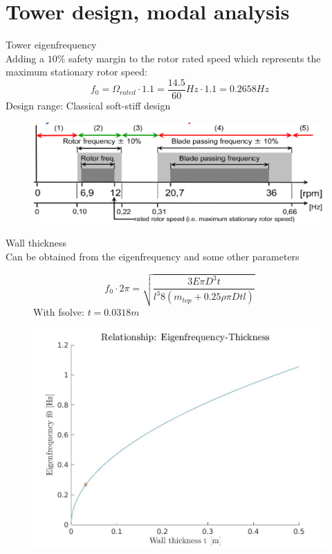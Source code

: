 \documentclass[12pt,t]{beamer}
\begin{document}
\section{Tower design, modal analysis}
\begin{frame}
\huge
Tower eigenfrequency\\[20pt]
\normalsize
Adding a $10 \%$ safety margin to the rotor rated speed which represents the maximum stationary rotor speed:
\begin{equation*}
	f_0 = \Omega_{rated} \cdot 1.1 = \frac{14.5}{60} Hz \cdot 1.1 = 0.2658 Hz
\end{equation*}
Design range: Classical soft-stiff design
\begin{figure}
\includegraphics[width=0.8\linewidth]{figures/designranges.png}
\end{figure}
\end{frame}

\begin{frame}
\huge
Wall thickness \\[20pt]
\small
Can be obtained from the eigenfrequency and some other parameters
\begin{figure}[htbp]
        \begin{minipage}{0.3\linewidth}
        \scriptsize
			\begin{equation*}
			f_0 \cdot 2 \pi  = \sqrt{\frac{3 E \pi D^3 t}{l^3 8 (m_{top} + 0.25\rho \pi D t l)}}
			\end{equation*}
			With fsolve:  $t=0.0318m$
        \end{minipage}
		\qquad
        \begin{minipage}{0.5\linewidth}
			\includegraphics[width=\linewidth]{../CIP_4/figures/eigenfrequency.jpg}
        \end{minipage}
\end{figure}
\end{frame}
\end{document}
